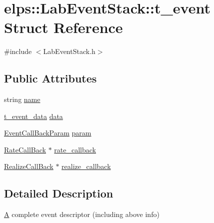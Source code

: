\hypertarget{structelps_1_1_lab_event_stack_1_1t__event}{\section{elps\+:\+:Lab\+Event\+Stack\+:\+:t\+\_\+event Struct Reference}
\label{structelps_1_1_lab_event_stack_1_1t__event}
}


{\ttfamily \#include $<$Lab\+Event\+Stack.\+h$>$}

\subsection*{Public Attributes}
\begin{DoxyCompactItemize}
\item 
string \hyperlink{structelps_1_1_lab_event_stack_1_1t__event_a538290fe829f0a5d8b3cea01ce4c26d1}{name}
\item 
\hyperlink{structelps_1_1_lab_event_stack_1_1t__event__data}{t\+\_\+event\+\_\+data} \hyperlink{structelps_1_1_lab_event_stack_1_1t__event_a1044f494c01f5ea07e218b3e864d7d01}{data}
\item 
\hyperlink{namespaceelps_a1bd4230d698fa66dd38f0fc1cc5c2c55}{Event\+Call\+Back\+Param} \hyperlink{structelps_1_1_lab_event_stack_1_1t__event_a850614c485c934dde0a12df273c1c393}{param}
\item 
\hyperlink{namespaceelps_a121bfb217e5fbb734b95d3f7b6653fb2}{Rate\+Call\+Back} $\ast$ \hyperlink{structelps_1_1_lab_event_stack_1_1t__event_ad697b4f39052f9b55b906733d0a32f64}{rate\+\_\+callback}
\item 
\hyperlink{namespaceelps_adb49d5dbf827d9b190d0b1fd15e0193c}{Realize\+Call\+Back} $\ast$ \hyperlink{structelps_1_1_lab_event_stack_1_1t__event_ab355c4c6e93adf24080f312adc5e0873}{realize\+\_\+callback}
\end{DoxyCompactItemize}


\subsection{Detailed Description}
\hyperlink{class_a}{A} complete event descriptor (including above info) 

